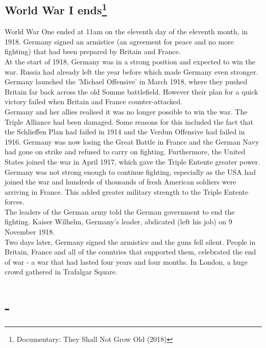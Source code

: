 \documentclass[11pt]{report}
\begin{document}
\subsection{World War I ends\protect\footnote{Documentary: They Shall Not Grow Old (2018)}}
World War One ended at 11am on the eleventh day of the eleventh month, in 1918. Germany signed an armistice (an agreement for peace and no more fighting) that had been prepared by Britain and France.\\
At the start of 1918, Germany was in a strong position and expected to win the war. Russia had already left the year before which made Germany even stronger.
Germany launched the 'Michael Offensive' in March 1918, where they pushed Britain far back across the old Somme battlefield. However their plan for a quick victory failed when Britain and France counter-attacked.\\
Germany and her allies realised it was no longer possible to win the war. The Triple Alliance had been damaged. Some reasons for this included the fact that the Schlieffen Plan had failed in 1914 and the Verdun Offensive had failed in 1916. Germany was now losing the Great Battle in France and the German Navy had gone on strike and refused to carry on fighting. Furthermore, the United States joined the war in April 1917, which gave the Triple Entente greater power.\\
Germany was not strong enough to continue fighting, especially as the USA had joined the war and hundreds of thousands of fresh American soldiers were arriving in France. This added greater military strength to the Triple Entente forces.\\
The leaders of the German army told the German government to end the fighting. Kaiser Wilhelm, Germany's leader, abdicated (left his job) on 9 November 1918.\\
Two days later, Germany signed the armistice and the guns fell silent. People in Britain, France and all of the countries that supported them, celebrated the end of war - a war that had lasted four years and four months. In London, a huge crowd gathered in Trafalgar Square.
\section{-}
\end{document}

